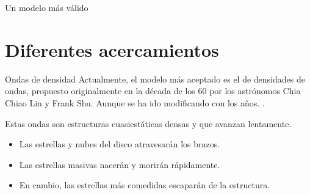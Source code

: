 \documentclass{beamer}
\begin{document}
\begin{frame}{Un modelo más válido}
\section{Diferentes acercamientos}
\begin{block}{Ondas de densidad}
Actualmente, el modelo más aceptado es el de densidades de ondas, propuesto originalmente en la década de los 60  por los astrónomos Chia Chiao Lin y Frank Shu. Aunque se ha ido modificando con los años. \cite{LinShu}.
\end{block}
Estas ondas son estructuras cuasiestáticas densas y que avanzan lentamente.
\begin{itemize}
    \item Las estrellas y nubes del disco atravesarán los brazos.%
    \item Las estrellas masivas nacerán y morirán rápidamente.%
    \item En cambio, las estrellas más comedidas escaparán de la estructura.
\end{itemize}
\end{frame}
\end{document}
